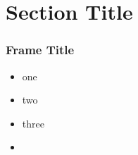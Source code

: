 \section{Section Title}

\begin{frame}
\frametitle{Frame Title}

\begin{itemize}[<+->]
    \item one
    \item two
    \item three
    \item {}
\end{itemize}
\end{frame}


